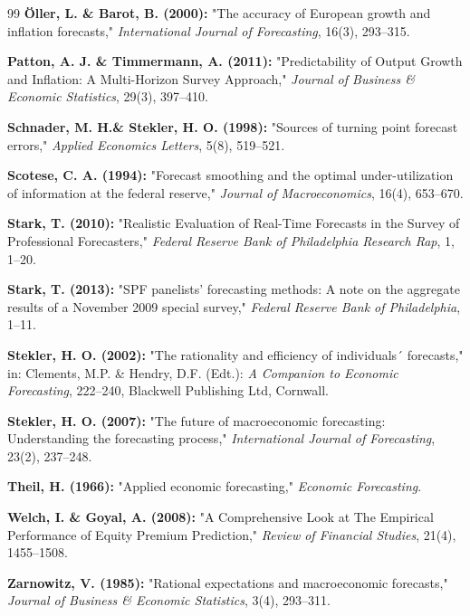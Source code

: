 \documentclass[12pt,a4paper]{article}
\begin{document}
\begin{thebibliography}{99}
	\textbf{Öller, L. \& Barot, B. (2000):}
	"The accuracy of European growth and inflation forecasts,"
	\emph{International Journal of Forecasting}, 16(3), 293--315.
	
	\textbf{Patton, A. J. \& Timmermann, A. (2011):}
	"Predictability of Output Growth and Inflation: A Multi-Horizon Survey Approach,"
	\emph{Journal of Business \& Economic Statistics}, 29(3), 397--410.
	
	\textbf{Schnader, M. H.\& Stekler, H. O. (1998):}
	"Sources of turning point forecast errors,"
	\emph{Applied Economics Letters}, 5(8), 519--521.
	
	\textbf{Scotese, C. A. (1994):}
	"Forecast smoothing and the optimal under-utilization of information at the federal reserve,"
	\emph{Journal of Macroeconomics}, 16(4), 653--670.
	
	\textbf{Stark, T. (2010):}
	"Realistic Evaluation of Real-Time Forecasts in the Survey of Professional Forecasters,"
	\emph{Federal Reserve Bank of Philadelphia Research Rap}, 1, 1--20.
	
	\textbf{Stark, T. (2013):}
	"SPF panelists' forecasting methods: A note on the aggregate results of a November 2009 special survey,"
	\emph{Federal Reserve Bank of Philadelphia}, 1--11.
	
	\textbf{Stekler, H. O. (2002):}
	"The rationality and efficiency of individuals´ forecasts,"
	in: Clements, M.P. \& Hendry, D.F. (Edt.):
	\emph{A Companion to Economic Forecasting}, 222--240, Blackwell Publishing Ltd, Cornwall.
	
	\textbf{Stekler, H. O. (2007):}
	"The future of macroeconomic forecasting: Understanding the forecasting process,"
	\emph{International Journal of Forecasting}, 23(2), 237--248.
	
	\textbf{Theil, H. (1966):}
	"Applied economic forecasting,"
	\emph{Economic Forecasting}.	
	
	\textbf{Welch, I. \& Goyal, A. (2008):}
	"A Comprehensive Look at The Empirical Performance of Equity Premium Prediction,"
	\emph{Review of Financial Studies}, 21(4), 1455--1508.
	
	\textbf{Zarnowitz, V. (1985):}
	"Rational expectations and macroeconomic forecasts,"
	\emph{Journal of Business \& Economic Statistics}, 3(4), 293--311.
	

\end{thebibliography}
\end{document}
